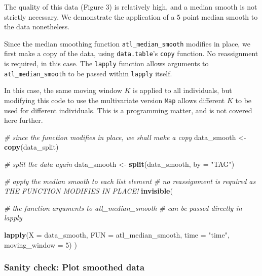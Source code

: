 \documentclass[]{scrartcl}
\newenvironment{Shaded}{}{}
\newcommand{\CommentTok}[1]{\textcolor[rgb]{0.38,0.63,0.69}{\textit{#1}}}
\newcommand{\DataTypeTok}[1]{\textcolor[rgb]{0.56,0.13,0.00}{#1}}
\newcommand{\DecValTok}[1]{\textcolor[rgb]{0.25,0.63,0.44}{#1}}
\newcommand{\KeywordTok}[1]{\textcolor[rgb]{0.00,0.44,0.13}{\textbf{#1}}}
\newcommand{\NormalTok}[1]{#1}
\newcommand{\StringTok}[1]{\textcolor[rgb]{0.25,0.44,0.63}{#1}}
\begin{document}
The quality of this data (Figure 3) is relatively high, and a median smooth is not strictly necessary. We demonstrate the application of a 5 point median smooth to the data nonetheless.

Since the median smoothing function \texttt{atl\_median\_smooth} modifies in place, we first make a copy of the data, using \texttt{data.table}'s \texttt{copy} function.
No reassignment is required, in this case. The \texttt{lapply} function allows arguments to \texttt{atl\_median\_smooth} to be passed within \texttt{lapply} itself.

In this case, the same moving window \(K\) is applied to all individuals, but modifying this code to use the multivariate version \texttt{Map} allows different \(K\) to be used for different individuals. This is a programming matter, and is not covered here further.

\begin{Shaded}
\begin{Highlighting}[]
\CommentTok{# since the function modifies in place, we shall make a copy}
\NormalTok{data_smooth <-}\StringTok{ }\KeywordTok{copy}\NormalTok{(data_split)}

\CommentTok{# split the data again}
\NormalTok{data_smooth <-}\StringTok{ }\KeywordTok{split}\NormalTok{(data_smooth, }\DataTypeTok{by =} \StringTok{"TAG"}\NormalTok{)}
\end{Highlighting}
\end{Shaded}

\begin{Shaded}
\begin{Highlighting}[]
\CommentTok{# apply the median smooth to each list element}
\CommentTok{# no reassignment is required as THE FUNCTION MODIFIES IN PLACE!}
\KeywordTok{invisible}\NormalTok{(}
  
  \CommentTok{# the function arguments to atl_median_smooth}
  \CommentTok{# can be passed directly in lapply}
  
  \KeywordTok{lapply}\NormalTok{(}\DataTypeTok{X =}\NormalTok{ data_smooth, }
         \DataTypeTok{FUN =}\NormalTok{ atl_median_smooth,}
         \DataTypeTok{time =} \StringTok{"time"}\NormalTok{, }\DataTypeTok{moving_window =} \DecValTok{5}\NormalTok{)}
\NormalTok{)}
\end{Highlighting}
\end{Shaded}

\hypertarget{sanity-check-plot-smoothed-data}{%
\subsubsection{Sanity check: Plot smoothed data}\label{sanity-check-plot-smoothed-data}}
\end{document}
